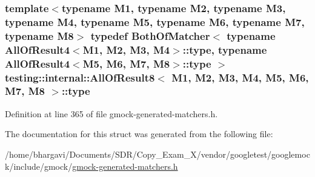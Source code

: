\subsubsection[{\texorpdfstring{type}{type}}]{\setlength{\rightskip}{0pt plus 5cm}template$<$typename M1, typename M2, typename M3, typename M4, typename M5, typename M6, typename M7, typename M8$>$ typedef {\bf Both\+Of\+Matcher}$<$ typename {\bf All\+Of\+Result4}$<$M1, M2, M3, M4$>$\+::{\bf type}, typename {\bf All\+Of\+Result4}$<$M5, M6, M7, M8$>$\+::{\bf type} $>$ {\bf testing\+::internal\+::\+All\+Of\+Result8}$<$ M1, M2, M3, M4, M5, M6, M7, M8 $>$\+::{\bf type}}\hypertarget{structtesting_1_1internal_1_1_all_of_result8_a7103892a28c35221b9e62e871c577727}{}\label{structtesting_1_1internal_1_1_all_of_result8_a7103892a28c35221b9e62e871c577727}


Definition at line 365 of file gmock-\/generated-\/matchers.\+h.



The documentation for this struct was generated from the following file\+:\begin{DoxyCompactItemize}
\item 
/home/bhargavi/\+Documents/\+S\+D\+R/\+Copy\+\_\+\+Exam\+\_\+X/vendor/googletest/googlemock/include/gmock/\hyperlink{gmock-generated-matchers_8h}{gmock-\/generated-\/matchers.\+h}\end{DoxyCompactItemize}
